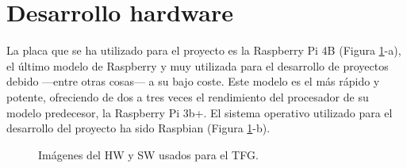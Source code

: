 \section{Desarrollo hardware}
\label{sec:deshw}
La placa que se ha utilizado para el proyecto es la Raspberry Pi 4B (Figura \ref{fig:rasp}-a), el último modelo de Raspberry y muy utilizada para el desarrollo de proyectos debido ---entre otras cosas--- a su bajo coste. Este modelo es el más rápido y potente, ofreciendo de dos a tres veces el rendimiento del procesador de su modelo predecesor, la Raspberry Pi 3b+. El sistema operativo utilizado para el desarrollo del proyecto ha sido Raspbian (Figura \ref{fig:rasp}-b).\\
\begin{figure}[h!]
  \begin{center}
    \hspace{1mm}
  \end{center}
\caption{Imágenes del HW y SW usados para el TFG.} \label{fig:rasp}
\end{figure}

